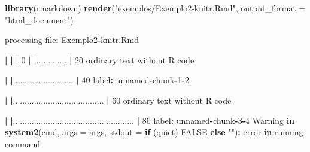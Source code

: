 \documentclass[10pt,a4paper]{book}
\newenvironment{Shaded}{\begin{snugshade}}{\end{snugshade}}
\newcommand{\KeywordTok}[1]{\textcolor[rgb]{0.13,0.29,0.53}{\textbf{#1}}}
\newcommand{\DataTypeTok}[1]{\textcolor[rgb]{0.13,0.29,0.53}{#1}}
\newcommand{\DecValTok}[1]{\textcolor[rgb]{0.00,0.00,0.81}{#1}}
\newcommand{\StringTok}[1]{\textcolor[rgb]{0.31,0.60,0.02}{#1}}
\newcommand{\OtherTok}[1]{\textcolor[rgb]{0.56,0.35,0.01}{#1}}
\newcommand{\ControlFlowTok}[1]{\textcolor[rgb]{0.13,0.29,0.53}{\textbf{#1}}}
\newcommand{\OperatorTok}[1]{\textcolor[rgb]{0.81,0.36,0.00}{\textbf{#1}}}
\newcommand{\ErrorTok}[1]{\textcolor[rgb]{0.64,0.00,0.00}{\textbf{#1}}}
\newcommand{\NormalTok}[1]{#1}
\begin{document}
\begin{Shaded}
\begin{Highlighting}[]
\KeywordTok{library}\NormalTok{(rmarkdown)}
\KeywordTok{render}\NormalTok{(}\StringTok{"exemplos/Exemplo2-knitr.Rmd"}\NormalTok{,  }\DataTypeTok{output_format =} \StringTok{"html_document"}\NormalTok{)}


\NormalTok{processing file}\OperatorTok{:}\StringTok{ }\NormalTok{Exemplo2}\OperatorTok{-}\NormalTok{knitr.Rmd}

  \OperatorTok{|}\StringTok{                                                                       }
\StringTok{  }\ErrorTok{|}\StringTok{                                                                 }\ErrorTok{|}\StringTok{   }\DecValTok{0}\NormalTok{%
  \OperatorTok{|}\StringTok{                                                                       }
\StringTok{  }\ErrorTok{|}\NormalTok{.............                                                    }\OperatorTok{|}\StringTok{  }\DecValTok{20}\NormalTok{%
\NormalTok{  ordinary text without R code}


  \OperatorTok{|}\StringTok{                                                                       }
\StringTok{  }\ErrorTok{|}\NormalTok{..........................                                       }\OperatorTok{|}\StringTok{  }\DecValTok{40}\NormalTok{%
\NormalTok{label}\OperatorTok{:}\StringTok{ }\NormalTok{unnamed}\OperatorTok{-}\NormalTok{chunk}\OperatorTok{-}\DecValTok{1}\OperatorTok{-}\DecValTok{2}

  \OperatorTok{|}\StringTok{                                                                       }
\StringTok{  }\ErrorTok{|}\NormalTok{.......................................                          }\OperatorTok{|}\StringTok{  }\DecValTok{60}\NormalTok{%
\NormalTok{  ordinary text without R code}


  \OperatorTok{|}\StringTok{                                                                       }
\StringTok{  }\ErrorTok{|}\NormalTok{....................................................             }\OperatorTok{|}\StringTok{  }\DecValTok{80}\NormalTok{%
\NormalTok{label}\OperatorTok{:}\StringTok{ }\NormalTok{unnamed}\OperatorTok{-}\NormalTok{chunk}\OperatorTok{-}\DecValTok{3}\OperatorTok{-}\DecValTok{4}
\NormalTok{Warning }\ControlFlowTok{in} \KeywordTok{system2}\NormalTok{(cmd, }\DataTypeTok{args =}\NormalTok{ args, }\DataTypeTok{stdout =} \ControlFlowTok{if}\NormalTok{ (quiet) }\OtherTok{FALSE} \ControlFlowTok{else} \StringTok{""}\NormalTok{)}\OperatorTok{:}
\NormalTok{error }\ControlFlowTok{in}\NormalTok{ running command}

}}}}}
\end{Highlighting}
\end{Shaded}
\end{document}
